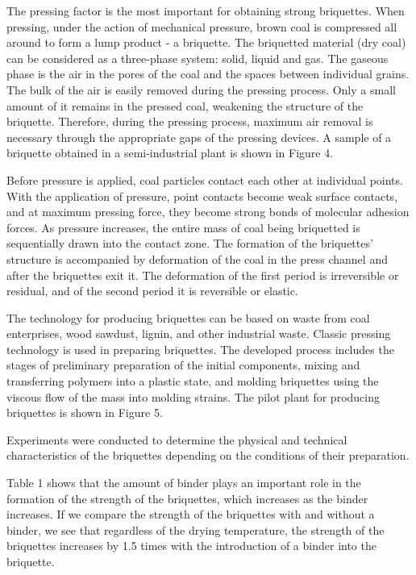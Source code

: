 \begin{multicols}{2}
The pressing factor is the most important for obtaining strong
briquettes. When pressing, under the action of mechanical pressure,
brown coal is compressed all around to form a lump product - a
briquette. The briquetted material (dry coal) can be considered as a
three-phase system: solid, liquid and gas. The gaseous phase is the air
in the pores of the coal and the spaces between individual grains. The
bulk of the air is easily removed during the pressing process. Only a
small amount of it remains in the pressed coal, weakening the structure
of the briquette. Therefore, during the pressing process, maximum air
removal is necessary through the appropriate gaps of the pressing
devices. A sample of a briquette obtained in a semi-industrial plant is
shown in Figure 4.

Before pressure is applied, coal particles contact each other at
individual points. With the application of pressure, point contacts
become weak surface contacts, and at maximum pressing force, they become
strong bonds of molecular adhesion forces. As pressure increases, the
entire mass of coal being briquetted is sequentially drawn into the
contact zone. The formation of the briquettes'{}
structure is accompanied by deformation of the coal in the press channel
and after the briquettes exit it. The deformation of the first period is
irreversible or residual, and of the second period it is reversible or
elastic.

The technology for producing briquettes can be based on waste from coal
enterprises, wood sawdust, lignin, and other industrial waste. Classic
pressing technology is used in preparing briquettes. The developed
process includes the stages of preliminary preparation of the initial
components, mixing and transferring polymers into a plastic state, and
molding briquettes using the viscous flow of the mass into molding
strains. The pilot plant for producing briquettes is shown in Figure 5.

Experiments were conducted to determine the physical and technical
characteristics of the briquettes depending on the conditions of their
preparation.

Table 1 shows that the amount of binder plays an important role in the
formation of the strength of the briquettes, which increases as the
binder increases. If we compare the strength of the briquettes with and
without a binder, we see that regardless of the drying temperature, the
strength of the briquettes increases by 1.5 times with the introduction
of a binder into the briquette.
\end{multicols}

